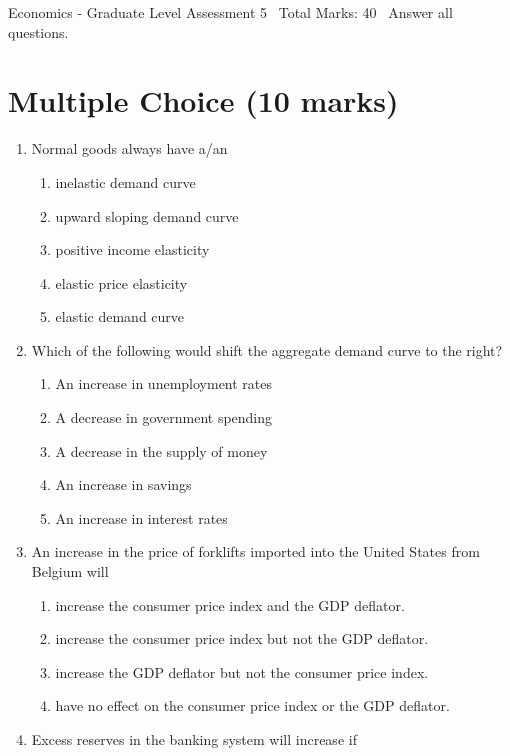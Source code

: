 \documentclass[12pt]{article}
\begin{document}
\begin{center}
Economics - Graduate Level Assessment 5 \
Total Marks: 40 \
Answer all questions.
\end{center}

\section*{Multiple Choice (10 marks)}
\begin{enumerate}[label=\arabic*.]
\item Normal goods always have a/an
\begin{enumerate}[label=(\alph*)]
    \item inelastic demand curve
    \item upward sloping demand curve
    \item positive income elasticity
    \item elastic price elasticity
    \item elastic demand curve
\end{enumerate}
\item Which of the following would shift the aggregate demand curve to the right?
\begin{enumerate}[label=(\alph*)]
    \item An increase in unemployment rates
    \item A decrease in government spending
    \item A decrease in the supply of money
    \item An increase in savings
    \item An increase in interest rates
\end{enumerate}
\item An increase in the price of forklifts imported into the United States from Belgium will
\begin{enumerate}[label=(\alph*)]
    \item increase the consumer price index and the GDP deflator.
    \item increase the consumer price index but not the GDP deflator.
    \item increase the GDP deflator but not the consumer price index.
    \item have no effect on the consumer price index or the GDP deflator.
\end{enumerate}
\item Excess reserves in the banking system will increase if
\begin{enumerate}[label=(\alph*)]

\end{enumerate}
\end{enumerate}
\end{document}
